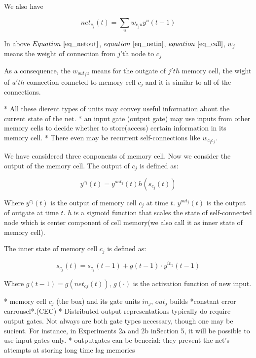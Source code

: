 \documentclass[officiallayout]{tktla}
\begin{document}
We also have 


\begin{equation}
net_{c_j}(t) = \sum_u w_{c_ju}y^u(t-1) \label{eq_cell}
\end{equation}


In above $Equation~\ref{eq_netout}$, $equation~\ref{eq_netin}$, $equation~\ref{eq_cell}$, $w_{j}$ means the weight of connection from $j$'th node to $c_j$

As a consequence, the $w_{out_ju}$ means for the outgate of $j'th$ memory cell, the wight of $u'th$ connection conneted to memory cell $c_j$ and it is similar to all of the connections.

* All these dierent types of units may convey useful information about the current state of the net.
* an input gate (output gate) may use inputs from other memory cells to decide whether to store(access) certain information in its memory cell.
* There even may be recurrent self-connections like $w_{c_jc_j}$.

We have considered three conponents of memory cell. Now we consider the output of the memory cell.
The output of $c_j$ is defined as:


\begin{equation}
y^{c_j}(t) = y^{out_j}(t)h(s_{c_j}(t)) \label{eq_cell_out}
\end{equation}


Where $y^{c_j}(t)$ is the output of memory cell $c_j$ at time $t$. $y^{out_j}(t)$ is the output of outgate at time $t$. $h$ is a sigmoid function that scales the state of self-connected node which is center component of cell memory(we also call it as inner state of memory cell).

The inner state of memory cell $c_j$ is defined as:


\begin{equation}
s_{c_j}(t) = s_{c_j}(t-1) + g(t-1)\cdot y^{in_j}(t-1)
\end{equation}


Where $g(t-1) = g(net_{cj}(t))$, $g(\cdot)$ is the activation function of new input. 

* memory cell $c_j$ (the box) and its gate units $in_j$, $out_j$ builds *constant error carrousel*.(CEC)
* Distributed output representations typically do require output gates. Not always are both gate types necessary, though one may be sucient. For instance, in Experiments 2a and 2b inSection 5, it will be possible to use input gates only.
* outputgates can be benecial: they prevent the net's attempts at storing long time lag memories 
\end{document}
